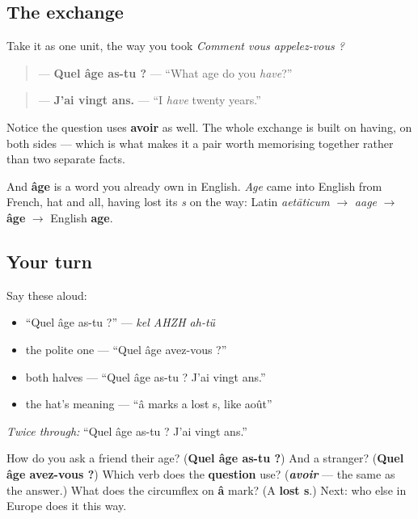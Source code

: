 \subsection*{The exchange}
Take it as one unit, the way you took \emph{Comment vous appelez-vous ?}

\begin{quote}
— \textbf{Quel âge as-tu ?} — \textquotedblleft{}What age do you \emph{have}?\textquotedblright{}
\end{quote}

\begin{quote}
— \textbf{J'ai vingt ans.} — \textquotedblleft{}I \emph{have} twenty years.\textquotedblright{}
\end{quote}

Notice the question uses \textbf{avoir} as well. The whole exchange is built on having, on both sides — which is what makes it a pair worth memorising together rather than two separate facts.

And \textbf{âge} is a word you already own in English. \emph{Age} came into English from French, hat and all, having lost its \emph{s} on the way: Latin \emph{aetāticum} $\to$ \emph{aage} $\to$ \textbf{âge} $\to$ English \textbf{age}.

\subsection*{Your turn}
Say these aloud:

\begin{itemize}
\raggedright
  \item \textquotedblleft{}Quel âge as-tu ?\textquotedblright{} — \emph{kel AHZH ah-tü}
  \item the polite one — \textquotedblleft{}Quel âge avez-vous ?\textquotedblright{}
  \item both halves — \textquotedblleft{}Quel âge as-tu ? J'ai vingt ans.\textquotedblright{}
  \item the hat's meaning — \textquotedblleft{}â marks a lost s, like août\textquotedblright{}
\end{itemize}

\emph{Twice through:} \textquotedblleft{}Quel âge as-tu ? J'ai vingt ans.\textquotedblright{}

\begin{tcolorbox}[breakable,colback=teal!4,colframe=teal!35!black,title={Before you move on}]
How do you ask a friend their age? (\textbf{Quel âge as-tu ?}) And a stranger? (\textbf{Quel âge avez-vous ?}) Which verb does the \textbf{question} use? (\emph{\textbf{avoir}} — the same as the answer.) What does the circumflex on \textbf{â} mark? (A \textbf{lost s}.) Next: who else in Europe does it this way.
\end{tcolorbox}
